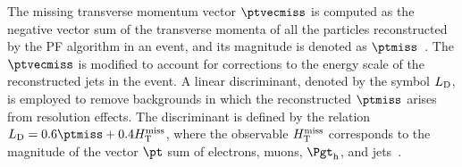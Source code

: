 
The missing transverse momentum vector $\ptvecmiss$ is computed as the negative vector sum of the transverse momenta of all the particles reconstructed by the PF algorithm in an event, 
and its magnitude is denoted as $\ptmiss$~\cite{Sirunyan:2019kia}. 
The $\ptvecmiss$ is modified to account for corrections to the energy scale of the reconstructed jets in the event. 
A linear discriminant, denoted by the symbol $L_\mathrm{D}$,
is employed to remove backgrounds in which the reconstructed $\ptmiss$ arises from resolution effects.
The discriminant is defined by the relation $\metLD = 0.6 \ptmiss + 0.4 \metHT$,
where the observable $H_{\mathrm{T}}^\text{miss}$ corresponds to the magnitude of the vector $\pt$ sum of electrons, muons, $\tauh$, and jets~\cite{Sirunyan:2018shy}.
